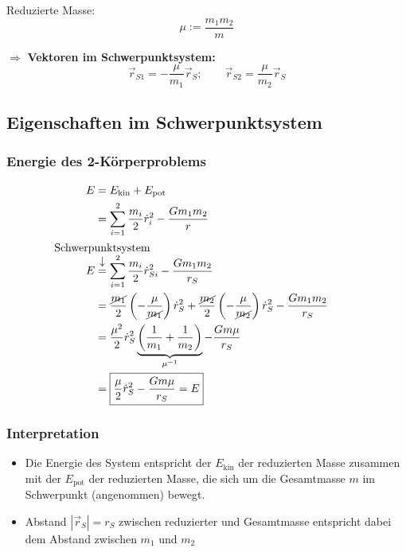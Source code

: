 \begin{definition}
    Reduzierte Masse:
    \[ \boxed{\mu := \frac{m_1 m_2}{m}} \]
\end{definition}

$\Rightarrow$ \textbf{Vektoren im Schwerpunktsystem:}
\[ \vec r_{S1} = - \frac{\mu}{m_1} \vec r_S; \qquad \vec r_{S2} = \frac{\mu}{m_2} \vec r_S\]

\subsection{Eigenschaften im Schwerpunktsystem}
\subsubsection{Energie des 2-Körperproblems}
\begin{align*}
    E &= E_{\mathrm{kin}} + E_{\mathrm{pot}} \\
      &= \sum\limits_{i=1}^2 \frac{m_i}{2} \dot r_i^2 - \frac{G m_1 m_2}{r} \\
    E &\mathrel{\overset{\mathclap{
        \begin{matrix}
            \text{Schwerpunktsystem} \\
            \downarrow
        \end{matrix}
        }}=} \sum\limits_{i = 1}^2 \frac{m_i}{2} \dot r_{Si}^2 - \frac{G m_1 m_2}{r_S} \\
      &= \frac{\cancel{m_1}}{2} \left(- \frac{\mu}{\cancel{m_1}}\right) \dot r_S^2 +
         \frac{\cancel{m_2}}{2} \left(- \frac{\mu}{\cancel{m_2}}\right) \dot r_S^2 -
         \frac{G m_1 m_2}{r_S}\\
      &= \frac{\mu^2}{2} \dot r_S^2 \underbrace{\left(\frac{1}{m_1} + \frac{1}{m_2}\right)}_{\mu^{-1}}
         - \frac{G m \mu}{r_S} \\
      &= \boxed{\frac{\mu}{2} \dot r_S^2 - \frac{Gm\mu}{r_S} = E}
\end{align*}

\subsubsection{Interpretation}
\begin{itemize}
    \item Die Energie des System entspricht der $E_{\mathrm{kin}}$ der reduzierten 
          Masse zusammen mit der $E_{\mathrm{pot}}$ der reduzierten Masse,
          die sich um die Gesamtmasse $m$ im Schwerpunkt (angenommen) bewegt.
    \item Abstand $|\vec r_S| = r_S$ zwischen reduzierter und Gesamtmasse
          entspricht dabei dem Abstand zwischen $m_1$ und $m_2$
\end{itemize}

